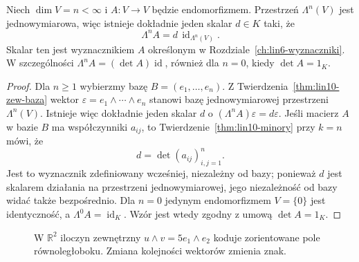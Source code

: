 \begin{twierdzenie}
\label{thm:lin10-det-wedge}
Niech \(\dim V=n<\infty\) i
\(A\colon V\to V\) będzie
endomorfizmem. Przestrzeń
\(\Lambda^n(V)\) jest jednowymiarowa,
więc istnieje dokładnie jeden
skalar \(d\in K\) taki, że
\[
 \Lambda^n A=d\,
   \operatorname{id}_{\Lambda^n(V)}.
\]
Skalar ten jest wyznacznikiem
\(A\) określonym w
Rozdziale~\ref{ch:lin6-wyznaczniki}.
W szczególności
\(\Lambda^n A=(\det A)\operatorname{id}\),
również dla \(n=0\), kiedy
\(\det A=1_K\).
\end{twierdzenie}
\begin{proof}
Dla \(n\ge1\) wybierzmy
bazę \(B=(e_1,\ldots,e_n)\).
Z
Twierdzenia~\ref{thm:lin10-zew-baza}
wektor
\(\varepsilon=e_1\wedge\cdots\wedge e_n\)
stanowi bazę jednowymiarowej
przestrzeni \(\Lambda^n(V)\).
Istnieje więc dokładnie
jeden skalar \(d\) o
\((\Lambda^n A)\varepsilon=d\varepsilon\).
Jeśli macierz \(A\) w bazie \(B\)
ma współczynniki \(a_{ij}\),
to
Twierdzenie~\ref{thm:lin10-minory}
przy \(k=n\) mówi, że
\[
 d=\det(a_{ij})_{i,j=1}^n.
\]
Jest to wyznacznik
zdefiniowany wcześniej,
niezależny od bazy;
ponieważ \(d\) jest skalarem
działania na przestrzeni
jednowymiarowej, jego
niezależność od bazy
widać także bezpośrednio.
Dla \(n=0\) jedynym
endomorfizmem \(V=\{0\}\)
jest identyczność,
a \(\Lambda^0 A=\operatorname{id}_K\).
Wzór jest wtedy zgodny
z umową \(\det A=1_K\).
\end{proof}

\begin{figure}[!htbp]
\centering
{}
\caption{W \(\mathbb R^2\) iloczyn zewnętrzny
\(u\wedge v=5e_1\wedge e_2\)
koduje zorientowane pole równoległoboku.
Zmiana kolejności wektorów zmienia znak.}
\label{fig:lin10-wedge-pole}
\end{figure}

